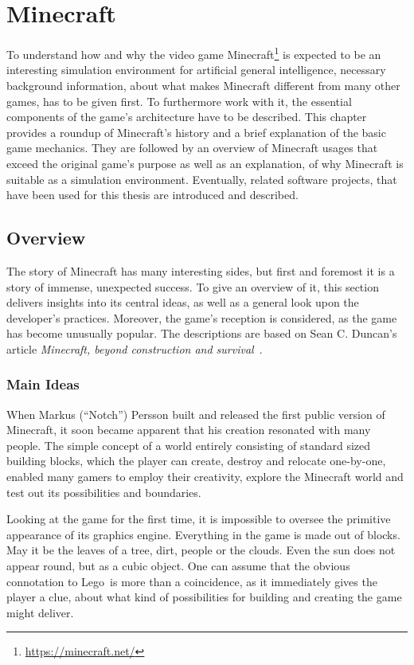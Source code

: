 \chapter{Minecraft}
\label{chap:3}
To understand how and why the video game Minecraft\footnote{\url{https://minecraft.net/}} is expected to be an interesting simulation environment for artificial general intelligence, necessary background information, about what makes Minecraft different from many other games, has to be given first. To furthermore work with it, the essential components of the game's architecture have to be described. This chapter provides a roundup of Minecraft's history and a brief explanation of the basic game mechanics. They are followed by an overview of Minecraft usages that exceed the original game's purpose as well as an explanation, of why Minecraft is suitable as a simulation environment. Eventually, related software projects, that have been used for this thesis are introduced and described.

    \section{Overview}
The story of Minecraft has many interesting sides, but first and foremost it is a story of immense, unexpected success. To give an overview of it, this section delivers insights into its central ideas, as well as a general look upon the developer's practices. Moreover, the game's reception is considered, as the game has become unusually popular. The descriptions are based on Sean C. Duncan's article \emph{Minecraft, beyond construction and survival}~\cite{Duncan:2011:MBC:2207096.2207097}.
    
        \subsection{Main Ideas}
When Markus (``Notch'') Persson built and released the first public version of Minecraft, it soon became apparent that his creation resonated with many people. The simple concept of a world entirely consisting of standard sized building blocks, which the player can create, destroy and relocate one-by-one, enabled many gamers to employ their creativity, explore the Minecraft world and test out its possibilities and boundaries.

Looking at the game for the first time, it is impossible to oversee the primitive appearance of its graphics engine. Everything in the game is made out of blocks. May it be the leaves of a tree, dirt, people or the clouds. Even the sun does not appear round, but as a cubic object. One can assume that the obvious connotation to Lego\texttrademark~is more than a coincidence, as it immediately gives the player a clue, about what kind of possibilities for building and creating the game might deliver.

